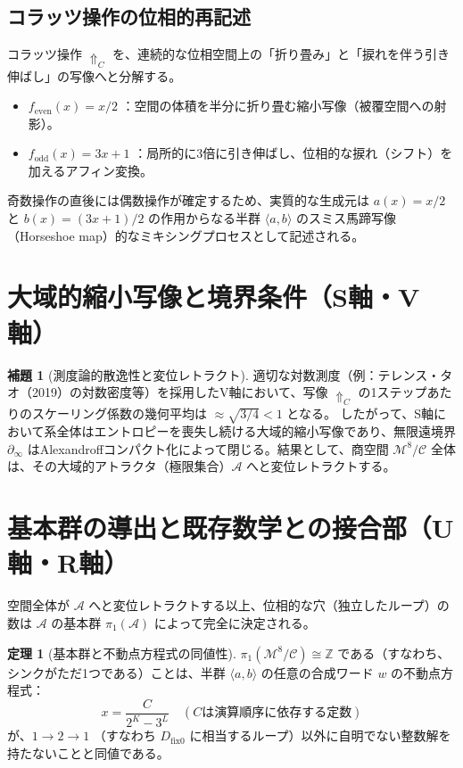 \documentclass[11pt,a4paper]{article}
\newcommand{\dfix}{D_{\mathrm{fix}0}}
\newcommand{\meta}{\Uparrow}
\theoremstyle{definition}
\newtheorem{theorem}{定理}[section]
\newtheorem{lemma}{補題}[section]
\begin{document}
\subsection{コラッツ操作の位相的再記述}
コラッツ操作 $\meta_C$ を、連続的な位相空間上の「折り畳み」と「捩れを伴う引き伸ばし」の写像へと分解する。
\begin{itemize}
    \item $f_{\text{even}}(x) = x/2$ ：空間の体積を半分に折り畳む縮小写像（被覆空間への射影）。
    \item $f_{\text{odd}}(x) = 3x+1$ ：局所的に3倍に引き伸ばし、位相的な捩れ（シフト）を加えるアフィン変換。
\end{itemize}
奇数操作の直後には偶数操作が確定するため、実質的な生成元は $a(x) = x/2$ と $b(x) = (3x+1)/2$ の作用からなる半群 $\langle a, b \rangle$ のスミス馬蹄写像（Horseshoe map）的なミキシングプロセスとして記述される。

\section{大域的縮小写像と境界条件（S軸・V軸）}

\begin{lemma}[測度論的散逸性と変位レトラクト]
適切な対数測度（例：テレンス・タオ（2019）の対数密度等）を採用したV軸において、写像 $\meta_C$ の1ステップあたりのスケーリング係数の幾何平均は $\approx \sqrt{3/4} < 1$ となる。
したがって、S軸において系全体はエントロピーを喪失し続ける大域的縮小写像であり、無限遠境界 $\partial_{\infty}$ はAlexandroffコンパクト化によって閉じる。結果として、商空間 $\mathcal{M}^8 / \mathcal{C}$ 全体は、その大域的アトラクタ（極限集合）$\mathcal{A}$ へと変位レトラクトする。
\end{lemma}

\section{基本群の導出と既存数学との接合部（U軸・R軸）}

空間全体が $\mathcal{A}$ へと変位レトラクトする以上、位相的な穴（独立したループ）の数は $\mathcal{A}$ の基本群 $\pi_1(\mathcal{A})$ によって完全に決定される。

\begin{theorem}[基本群と不動点方程式の同値性]
$\pi_1(\mathcal{M}^8 / \mathcal{C}) \cong \mathbb{Z}$ である（すなわち、シンクがただ1つである）ことは、半群 $\langle a, b \rangle$ の任意の合成ワード $w$ の不動点方程式：
\[
x = \frac{C}{2^K - 3^L} \quad (\text{$C$は演算順序に依存する定数})
\]
が、$1 \to 2 \to 1$ （すなわち $\dfix$ に相当するループ）以外に自明でない整数解を持たないことと同値である。
\end{theorem}
\end{document}
